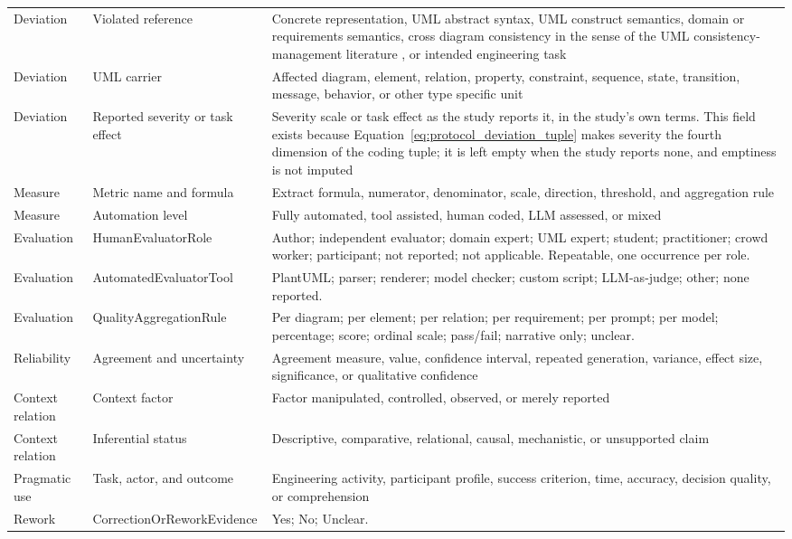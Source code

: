 \begin{longtable}{p{} p{} p{}}
Deviation & Violated reference & Concrete representation, UML abstract syntax, UML construct semantics, domain or requirements semantics, cross diagram consistency in the sense of the UML consistency-management literature \cite{Lucas2009UMLConsistency}, or intended engineering task \\
Deviation & UML carrier & Affected diagram, element, relation, property, constraint, sequence, state, transition, message, behavior, or other type specific unit \\
Deviation & Reported severity or task effect & Severity scale or task effect as the study reports it, in the study's own terms. This field exists because Equation~\ref{eq:protocol_deviation_tuple} makes severity the fourth dimension of the coding tuple; it is left empty when the study reports none, and emptiness is not imputed \\
Measure & Metric name and formula & Extract formula, numerator, denominator, scale, direction, threshold, and aggregation rule \\
Measure & Automation level & Fully automated, tool assisted, human coded, LLM assessed, or mixed \\
Evaluation & HumanEvaluatorRole & Author; independent evaluator; domain expert; UML expert; student; practitioner; crowd worker; participant; not reported; not applicable. Repeatable, one occurrence per role. \\
Evaluation & AutomatedEvaluatorTool & PlantUML; parser; renderer; model checker; custom script; LLM-as-judge; other; none reported. \\
Evaluation & QualityAggregationRule & Per diagram; per element; per relation; per requirement; per prompt; per model; percentage; score; ordinal scale; pass/fail; narrative only; unclear. \\
Reliability & Agreement and uncertainty & Agreement measure, value, confidence interval, repeated generation, variance, effect size, significance, or qualitative confidence \\
Context relation & Context factor & Factor manipulated, controlled, observed, or merely reported \\
Context relation & Inferential status & Descriptive, comparative, relational, causal, mechanistic, or unsupported claim \\
Pragmatic use & Task, actor, and outcome & Engineering activity, participant profile, success criterion, time, accuracy, decision quality, or comprehension \\
Rework & CorrectionOrReworkEvidence & Yes; No; Unclear. \\

\end{longtable}
